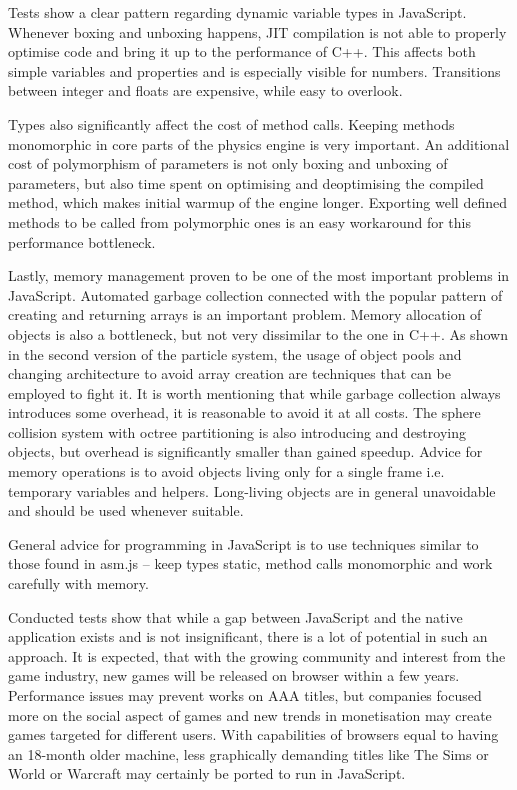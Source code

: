Tests show a clear pattern regarding dynamic variable types in JavaScript. Whenever boxing and unboxing happens, JIT compilation is not able to properly optimise code and bring it up to the performance of C++. This affects both simple variables and properties and is especially visible for numbers. Transitions between integer and floats are expensive, while easy to overlook.

Types also significantly affect the cost of method calls. Keeping methods monomorphic in core parts of the physics engine is very important. An additional cost of polymorphism of parameters is not only boxing and unboxing of parameters, but also time spent on optimising and deoptimising the compiled method, which makes initial warmup of the engine longer. Exporting well defined methods to be called from polymorphic ones is an easy workaround for this performance bottleneck.

Lastly, memory management proven to be one of the most important problems in JavaScript. Automated garbage collection connected with the popular pattern of creating and returning arrays is an important problem. Memory allocation of objects is also a bottleneck, but not very dissimilar to the one in C++. As shown in the second version of the particle system, the usage of object pools and changing architecture to avoid array creation are techniques that can be employed to fight it. It is worth mentioning that while garbage collection always introduces some overhead, it is reasonable to avoid it at all costs. The sphere collision system with octree partitioning is also introducing and destroying objects, but overhead is significantly smaller than gained speedup. Advice for memory operations is to avoid objects living only for a single frame i.e. temporary variables and helpers. Long-living objects are in general unavoidable and should be used whenever suitable.

General advice for programming in JavaScript is to use techniques similar to those found in asm.js -- keep types static, method calls monomorphic and work carefully with memory.

Conducted tests show that while a gap between JavaScript and the native application exists and is not insignificant, there is a lot of potential in such an approach. It is expected, that with the growing community and interest from the game industry, new games will be released on browser within a few years. Performance issues may prevent works on AAA titles, but companies focused more on the social aspect of games and new trends in monetisation may create games targeted for different users. With capabilities of browsers equal to having an 18-month older machine, less graphically demanding titles like The Sims or World or Warcraft may certainly be ported to run in JavaScript.
